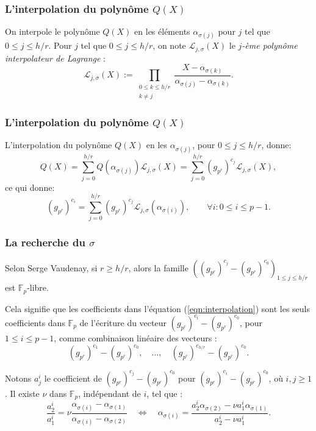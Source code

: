 \documentclass{beamer}
\theoremstyle{definition}
\theoremstyle{remark}
\def\gf #1{\mathbb{F}_{#1}}
\begin{document}
\begin{frame}
  \frametitle{L'interpolation du polynôme $Q(X)$}
  On interpole le polynôme $Q(X)$ en les éléments $\alpha_{\sigma(j)}$ pour $j$ tel que $0 \leqslant j \leqslant h/r$.
  Pour $j$ tel que $0\leqslant j \leqslant h/r$, on note $\mathcal L_{j,\sigma}(X)$ le \textit{$j$-ème polynôme interpolateur de Lagrange} :
$$\mathcal L_{j,\sigma}(X) := \prod_{\substack{0\leqslant k\leqslant h/r \\ k \neq j}}\frac{X-\alpha_{\sigma(k)}}{\alpha_{\sigma(j)}-\alpha_{\sigma(k)}}.$$
\end{frame}

\begin{frame}
  \frametitle{L'interpolation du polynôme $Q(X)$}
   L'interpolation du polynôme $Q(X)$ en les $\alpha_{\sigma(j)}$, pour $0 \leqslant j \leqslant h/r$, donne:
$$ Q(X) = \sum_{j=0}^{h/r} Q\left(\alpha_{\sigma(j)}\right) \mathcal L_{j,\sigma}(X) = \sum_{j=0}^{h/r} (g_{p^r})^{c_{j}} \mathcal L_{j,\sigma}(X),$$
ce qui donne:
\begin{equation}\label{eqn:interpolation}
(g_{p^r})^{c_i} = \sum_{j=0}^{h/r} (g_{p^r})^{c_{j}} \mathcal L_{j,\sigma}(\alpha_{\sigma(i)}),\qquad \forall i : 0\leqslant i \leqslant p-1.
\end{equation}
\end{frame}

\begin{frame}
  \frametitle{La recherche du $\sigma$}
  Selon Serge Vaudenay, si $r \geqslant h/r$, alors la famille $\left((g_{p^r})^{c_{j}} - (g_{p^r})^{c_{0}} \right)_{1\leqslant j \leqslant h/r}$ est $\gf{p}$-libre.

  Cela signifie que les coefficients dans l'équation (\ref{eqn:interpolation}) sont les seuls coefficients dans $\gf{p}$ de l'écriture du vecteur $(g_{p^r})^{c_{i}} - (g_{p^r})^{c_{0}}$, pour $1\leqslant i \leqslant p-1$, comme combinaison linéaire des vecteurs : $$(g_{p^r})^{c_{1}} - (g_{p^r})^{c_{0}},\quad \dots,\quad (g_{p^r})^{c_{{h/r}}} - (g_{p^r})^{c_{0}}.$$

  Notons $a_j^i$ le coefficient de $(g_{p^r})^{c_{{j}}} - (g_{p^r})^{c_{0}}$ pour $(g_{p^r})^{c_{i}} - (g_{p^r})^{c_{0}}$, où $i , j\geqslant 1$. Il existe $\nu$ dans $\gf{p}$, indépendant de $i$, tel que :
\begin{equation}\label{eqn:coeff}
\frac{a_2^i}{a_1^i} = \nu \frac{\alpha_{\sigma(i)}-\alpha_{\sigma(1)}}{\alpha_{\sigma(i)}-\alpha_{\sigma(2)}}\quad\Leftrightarrow\quad
\alpha_{\sigma(i)} = \frac{a_2^i\alpha_{\sigma(2)}-\nu a_1^i\alpha_{\sigma(1)}}{a_2^i-\nu a_1^i}.
\end{equation}
\end{frame}
\end{document}
